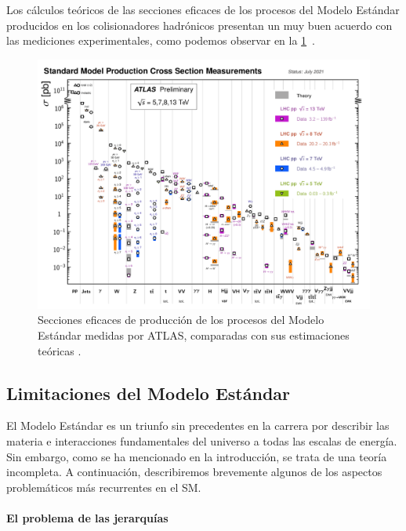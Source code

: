 Los cálculos teóricos de las secciones eficaces de los procesos del Modelo Estándar producidos en los colisionadores hadrónicos presentan un muy buen acuerdo con las mediciones experimentales, como podemos observar en la \cref{fig:ch1:SM:pp_interactions:cross_sections}~\cite{ATL-PHYS-PUB-2021-032}.

\begin{figure}[t]
  \includegraphics[width=\linewidth]{Assets/Plots/SM/ATLAS_b_SMSummary_FiducialXsect.pdf}
  \caption{Secciones eficaces de producción de los procesos del Modelo Estándar medidas por ATLAS, comparadas con sus estimaciones teóricas .}
  \label{fig:ch1:SM:pp_interactions:cross_sections}
\end{figure}





\subsection{Limitaciones del Modelo Estándar}

El Modelo Estándar es un triunfo sin precedentes en la carrera por describir las materia e interacciones fundamentales del universo a todas las escalas de energía. Sin embargo, como se ha mencionado en la introducción, se trata de una teoría incompleta. A continuación, describiremos brevemente algunos de los aspectos problemáticos más recurrentes en el SM.

\paragraph{El problema de las jerarquías}


